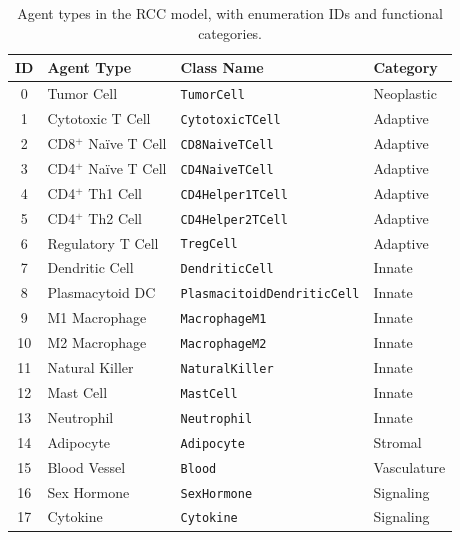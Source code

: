 \begin{table}[htbp]
\centering
\caption{Agent types in the RCC model, with enumeration IDs and functional categories.}
\label{tab:agent_types}
{\footnotesize
\begin{tabular}{@{}clll@{}}
\toprule
\textbf{ID} & \textbf{Agent Type} & \textbf{Class Name} & \textbf{Category} \\
\midrule
0  & Tumor Cell            & \texttt{TumorCell}                   & Neoplastic \\
1  & Cytotoxic T Cell       & \texttt{CytotoxicTCell}              & Adaptive \\
2  & CD8$^+$ Na\"ive T Cell & \texttt{CD8NaiveTCell}               & Adaptive \\
3  & CD4$^+$ Na\"ive T Cell & \texttt{CD4NaiveTCell}               & Adaptive \\
4  & CD4$^+$ Th1 Cell       & \texttt{CD4Helper1TCell}             & Adaptive \\
5  & CD4$^+$ Th2 Cell       & \texttt{CD4Helper2TCell}             & Adaptive \\
6  & Regulatory T Cell      & \texttt{TregCell}                    & Adaptive \\
7  & Dendritic Cell         & \texttt{DendriticCell}               & Innate \\
8  & Plasmacytoid DC        & \texttt{PlasmacitoidDendriticCell}   & Innate \\
9  & M1 Macrophage          & \texttt{MacrophageM1}                & Innate \\
10 & M2 Macrophage          & \texttt{MacrophageM2}                & Innate \\
11 & Natural Killer         & \texttt{NaturalKiller}               & Innate \\
12 & Mast Cell              & \texttt{MastCell}                    & Innate \\
13 & Neutrophil             & \texttt{Neutrophil}                  & Innate \\
14 & Adipocyte              & \texttt{Adipocyte}                   & Stromal \\
15 & Blood Vessel           & \texttt{Blood}                       & Vasculature \\
16 & Sex Hormone            & \texttt{SexHormone}                  & Signaling \\
17 & Cytokine               & \texttt{Cytokine}                    & Signaling \\
\bottomrule
\end{tabular}
}
\end{table}

